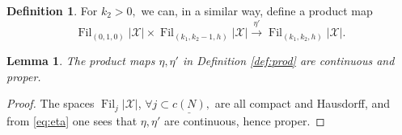 \documentclass[10pt,a4paper,twoside]{amsart}
\theoremstyle{plain}
\newtheorem{lem}[theo]{Lemma}
\theoremstyle{definition}
\newtheorem{defin}{Definition}
\theoremstyle{remark}
\begin{document}
\begin{defin}
For $k_2>0,$ we can, in a similar way, define a product map 
   $$\operatorname{Fil}_{{(0,1,0)}}|\mathcal{X}|\times\operatorname{Fil}_{{(k_1,k_2-1,h)}}|\mathcal{X}|\xrightarrow{\eta'}\operatorname{Fil}_{{(k_1,k_2,h)}}|\mathcal{X}|.$$

\end{defin}

\begin{lem}\label{lm:rkDiff2_1}
The product maps $\eta,\eta'$ in Definition \ref{def:prod} are continuous and proper.
\end{lem}
\begin{proof}
The spaces $\operatorname{Fil}_j|\mathcal{X}|$, $\forall j\subset\underline{c(N)},$ are all compact and Hausdorff, \cite[Section 2, Proposition 2.7]{Gor} and from \eqref{eq:eta} one sees that $\eta,\eta'$ are continuous, hence proper.

\end{proof}
\end{document}
